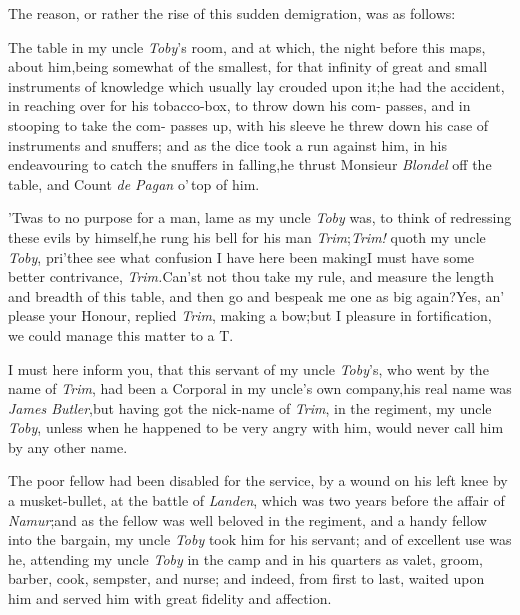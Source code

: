\documentclass{article}
\begin{document}
The reason, or rather the rise of this sudden demigration, was as
follows:

The table in my uncle \textit{Toby}’s room, and at which,
the night before this\break 
{}
maps, \etc about him,\tsk being somewhat\break
of the smallest, for that infinity of great\break
and small instruments of knowledge\break
which usually lay crouded upon it;\tsk he\break
had the accident, in reaching over for\break
his tobacco-box, to throw down his com-\break
passes, and in stooping to take the com-\break
passes up, with his sleeve he threw down\break
his case of instruments and snuffers;\tsk\break
and as the dice took a run against him,\break
in his endeavouring to catch the snuffers in
falling,\tsh he thrust Monsieur \textit{Blondel} off the
table, and Count \textit{de Pagan} o’\,top of him.

’Twas to no purpose for a man, lame as my uncle
\textit{Toby} was, to think of redressing these evils by
himself,\tsk he rung his bell for his man
\textit{Trim};\tsk \textit{Trim!} quoth my uncle \textit{Toby},
pri’thee see what
confusion I have here been making\tsk I must have some better
contrivance, \textit{Trim.}\tsk\break Can’st not thou take my rule,
and measure the length and breadth of this table, and then go and
bespeak me one as big again?\tsh Yes, an’ please
your \hbox{Honour,} replied \textit{Trim}, making a bow;\tsk but I\break 
{}
pleasure in
fortification, we could ma\-nage this matter to a T.\\

\newpage
I must here inform you, that this servant of my uncle
\textit{Toby}’s, who went by the name of \textit{Trim}, had been
a Corporal in my uncle’s own company,\tsh his real name was
\textit{James Butler},\tsk but having got the nick-name of
\textit{Trim}, in the regiment, my uncle \textit{Toby}, unless when he
happened to be very angry with him, would never call him by any
other name.

The poor fellow had been disabled for the service, by a
wound on his left knee by a musket-bullet, at the battle of
\textit{Landen}, which was two years before the affair of
\textit{Namur};\tsk and as the fellow was well beloved in
the regiment, and a\break
handy fellow into the bargain, my uncle \textit{Toby} took
him for his servant; and of excellent use was he, attending
my uncle \textit{Toby} in the camp and in his quarters as
valet, groom, barber, cook, sempster, and nurse; and
indeed, from first to last, waited upon him and served him
with great fidelity and affection.
\end{document}

